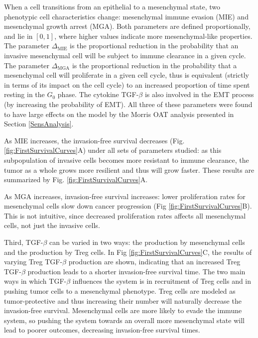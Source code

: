 \documentclass[11pt]{article}
\begin{document}
When a cell transitions from an epithelial to a mesenchymal state, two phenotypic cell characteristics change: mesenchymal immune evasion (MIE) and mesenchymal growth arrest (MGA).
Both parameters are defined proportionally, and lie in $[0,1]$, where higher values indicate more mesenchymal-like properties.
The parameter $\Delta_\text{MIE}$ is the proportional reduction in the probability that an invasive mesenchymal cell will be subject to immune clearance in a given cycle.
The parameter $\Delta_\text{MGA}$ is the proportional reduction in the probability that a mesenchymal cell will proliferate in a given cell cycle, thus is equivalent (strictly in terms of its impact on the cell cycle) to an increased proportion of time spent resting in the $G_0$ phase.
The cytokine TGF-$\beta$ is also involved in the EMT process (by increasing the probability of EMT). All three of these parameters were found to have large effects on the model by the Morris OAT analysis presented in Section \ref{SensAnalysis}.
\par 
As MIE increases, the invasion-free survival decreases (Fig. \ref{fig:FirstSurvivalCurves}A) under all sets of parameters studied: as this subpopulation of invasive cells becomes more resistant to immune clearance, the tumor as a whole grows more resilient and thus will grow faster.
These results are summarized by Fig. \ref{fig:FirstSurvivalCurves}A.
\par
As MGA increases, invasion-free survival increases: lower proliferation rates for mesenchymal cells slow down cancer progression (Fig \ref{fig:FirstSurvivalCurves}B).
This is not intuitive, since decreased proliferation rates affects all mesenchymal cells, not just the invasive cells.
\par
Third, TGF-$\beta$ can be varied in two ways: the production by mesenchymal cells and the production by Treg cells.
In Fig \ref{fig:FirstSurvivalCurves}C, the results of varying Treg TGF-$\beta$ production are shown, indicating that an increased Treg TGF-$\beta$ production leads to a shorter invasion-free survival time.
The two main ways in which TGF-$\beta$ influences the system is in recruitment of Treg cells and in pushing tumor cells to a mesenchymal phenotype.
Treg cells are modeled as tumor-protective and thus increasing their number will naturally decrease the invasion-free survival.
Mesenchymal cells are more likely to evade the immune system, so pushing the system towards an overall more mesenchymal state will lead to poorer outcomes, decreasing invasion-free survival times.
\end{document}

